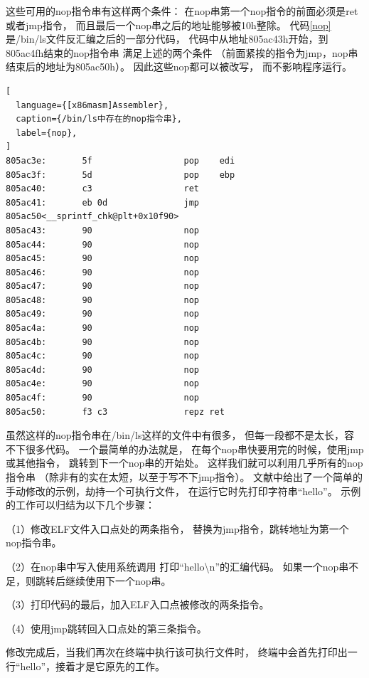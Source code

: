 这些可用的nop指令串有这样两个条件：
在nop串第一个nop指令的前面必须是ret或者jmp指令，
而且最后一个nop串之后的地址能够被10h整除。
代码\ref{nop}是/bin/ls文件反汇编之后的一部分代码，
代码中从地址805ac43h开始，到805ac4fh结束的nop指令串
满足上述的两个条件
（前面紧挨的指令为jmp，nop串结束后的地址为805ac50h）。
因此这些nop都可以被改写，
而不影响程序运行。

\begin{lstlisting}[
  language={[x86masm]Assembler},
  caption={/bin/ls中存在的nop指令串},
  label={nop},
]
805ac3e:       5f                  pop    edi
805ac3f:       5d                  pop    ebp
805ac40:       c3                  ret
805ac41:       eb 0d               jmp    805ac50<__sprintf_chk@plt+0x10f90>
805ac43:       90                  nop
805ac44:       90                  nop
805ac45:       90                  nop
805ac46:       90                  nop
805ac47:       90                  nop
805ac48:       90                  nop
805ac49:       90                  nop
805ac4a:       90                  nop
805ac4b:       90                  nop
805ac4c:       90                  nop
805ac4d:       90                  nop
805ac4e:       90                  nop
805ac4f:       90                  nop
805ac50:       f3 c3               repz ret
\end{lstlisting}

虽然这样的nop指令串在/bin/ls这样的文件中有很多，
但每一段都不是太长，容不下很多代码。
一个最简单的办法就是，
在每个nop串快要用完的时候，使用jmp或其他指令，
跳转到下一个nop串的开始处。
这样我们就可以利用几乎所有的nop指令串
（除非有的实在太短，以至于写不下jmp指令）。
文献\cite{heike}中给出了一个简单的手动修改的示例，劫持一个可执行文件，
在运行它时先打印字符串“hello”。
示例的工作可以归结为以下几个步骤：

（1）修改ELF文件入口点处的两条指令，
替换为jmp指令，跳转地址为第一个nop指令串。

（2）在nop串中写入使用系统调用
打印“hello\textbackslash n”的汇编代码。
如果一个nop串不足，则跳转后继续使用下一个nop串。

（3）打印代码的最后，加入ELF入口点被修改的两条指令。

（4）使用jmp跳转回入口点处的第三条指令。

修改完成后，当我们再次在终端中执行该可执行文件时，
终端中会首先打印出一行“hello”，接着才是它原先的工作。




